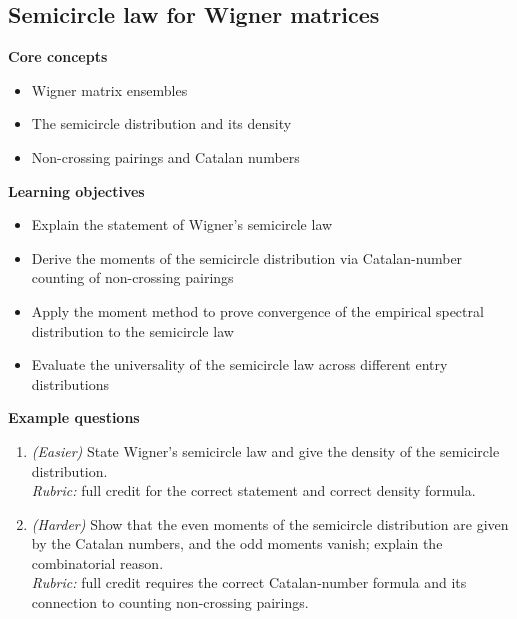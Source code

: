 \documentclass[11pt]{article}
\begin{document}
\subsection{Semicircle law for Wigner matrices}
\textbf{Core concepts}
\begin{itemize}[nosep]
\item Wigner matrix ensembles
\item The semicircle distribution and its density
\item Non-crossing pairings and Catalan numbers
\end{itemize}
\textbf{Learning objectives}
\begin{itemize}[nosep]
\item Explain the statement of Wigner's semicircle law
\item Derive the moments of the semicircle distribution via Catalan-number counting of non-crossing pairings
\item Apply the moment method to prove convergence of the empirical spectral distribution to the semicircle law
\item Evaluate the universality of the semicircle law across different entry distributions
\end{itemize}
\textbf{Example questions}
\begin{enumerate}[nosep]
\item \emph{(Easier)} State Wigner's semicircle law and give the density of the semicircle distribution. \\
\emph{Rubric:} full credit for the correct statement and correct density formula.
\item \emph{(Harder)} Show that the even moments of the semicircle distribution are given by the Catalan numbers, and the odd moments vanish; explain the combinatorial reason. \\
\emph{Rubric:} full credit requires the correct Catalan-number formula and its connection to counting non-crossing pairings.
\end{enumerate}
\end{document}
